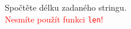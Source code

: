 \question[30]
Spočtěte délku zadaného stringu.\\
\textcolor{red}{Nesmíte použít funkci \texttt{len}!}